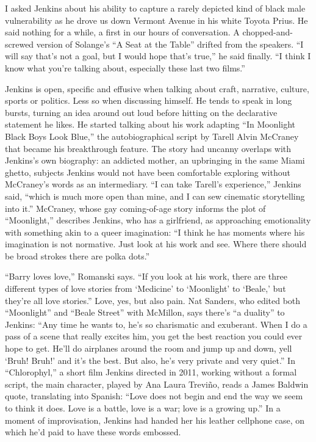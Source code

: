 I asked Jenkins about his ability to capture a rarely depicted kind of
black male vulnerability as he drove us down Vermont Avenue in his white
Toyota Prius. He said nothing for a while, a first in our hours of
conversation. A chopped-and-screwed version of Solange's ``A Seat at the
Table'' drifted from the speakers. ``I will say that's not a goal, but I
would hope that's true,'' he said finally. ``I think I know what you're
talking about, especially these last two films.''

Jenkins is open, specific and effusive when talking about craft,
narrative, culture, sports or politics. Less so when discussing himself.
He tends to speak in long bursts, turning an idea around out loud before
hitting on the declarative statement he likes. He started talking about
his work adapting ``In Moonlight Black Boys Look Blue,'' the
autobiographical script by Tarell Alvin McCraney that became his
breakthrough feature. The story had uncanny overlaps with Jenkins's own
biography: an addicted mother, an upbringing in the same Miami ghetto,
subjects Jenkins would not have been comfortable exploring without
McCraney's words as an intermediary. ``I can take Tarell's experience,''
Jenkins said, ``which is much more open than mine, and I can sew
cinematic storytelling into it.'' McCraney, whose gay coming-of-age
story informs the plot of ``Moonlight,'' describes Jenkins, who has a
girlfriend, as approaching emotionality with something akin to a queer
imagination: ``I think he has moments where his imagination is not
normative. Just look at his work and see. Where there should be broad
strokes there are polka dots.''

``Barry loves love,'' Romanski says. ``If you look at his work, there
are three different types of love stories from `Medicine' to `Moonlight'
to `Beale,' but they're all love stories.'' Love, yes, but also pain.
Nat Sanders, who edited both ``Moonlight'' and ``Beale Street'' with
McMillon, says there's ``a duality'' to Jenkins: ``Any time he wants to,
he's so charismatic and exuberant. When I do a pass of a scene that
really excites him, you get the best reaction you could ever hope to
get. He'll do airplanes around the room and jump up and down, yell
`Bruh! Bruh!' and it's the best. But also, he's very private and very
quiet.'' In ``Chlorophyl,'' a short film Jenkins directed in 2011,
working without a formal script, the main character, played by Ana Laura
Treviño, reads a James Baldwin quote, translating into Spanish: ``Love
does not begin and end the way we seem to think it does. Love is a
battle, love is a war; love is a growing up.'' In a moment of
improvisation, Jenkins had handed her his leather cellphone case, on
which he'd paid to have these words embossed.

